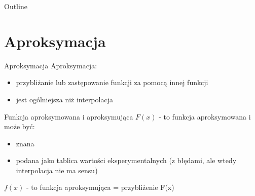 

\subtitle{5. Aproksymacja}

  	\maketitle
  	\begin{frame}{Outline}
  			\tableofcontents
  	\end{frame}
	\section{Aproksymacja}
    \begin{frame}{Aproksymacja}
        Aproksymacja:
		\begin{itemize}
            \item przybliżanie lub zastępowanie funkcji za pomocą innej funkcji
            \item jest ogólniejsza niż interpolacja
        \end{itemize}
    \end{frame}
    \begin{frame}{Funkcja aproksymowana i aproksymująca}
        $F(x)$ - to funkcja aproksymowana i może być:
        \begin{itemize}
          \item znana
          \item podana jako tablica wartości eksperymentalnych (z błędami, ale wtedy interpolacja nie ma sensu)
        \end{itemize}
        \hfill \break
        $f(x)$ - to funkcja aproksymująca = przybliżenie F(x)
	\end{frame}
	
     
    
     
    


